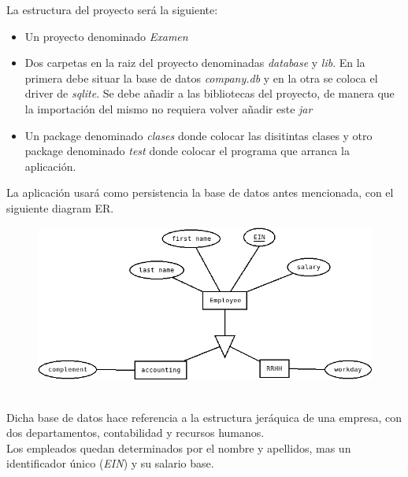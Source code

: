 \documentclass[addpoints,12pt]{exam}
\begin{document}
\begin{center}
\end{center}
\vspace{0.1in}
La estructura del proyecto será la siguiente:
\begin{itemize}
\item Un proyecto denominado \emph{Examen}
\item Dos carpetas en la raiz del proyecto denominadas \emph{database} y \emph{lib}. En la primera debe situar la base de datos \emph{company.db} y en la otra se coloca el driver de \emph{sqlite}. Se debe añadir a las bibliotecas del proyecto, de manera que la importación del mismo no requiera volver añadir este \emph{jar}
\item Un package denominado \emph{clases} donde colocar las disitintas clases y otro package denominado \emph{test} donde colocar el programa que arranca la aplicación.
\end{itemize}
La aplicación usará como persistencia la base de datos antes mencionada, con el siguiente diagram ER.\\
\begin{figure}[h]
\begin{center}
\includegraphics[scale=0.5]{er.png}
%
\end{center}
\end{figure}
\\
Dicha base de datos hace referencia a la estructura jeráquica de una empresa, con dos departamentos, contabilidad y recursos humanos.\\
Los empleados quedan determinados por el nombre y apellidos, mas un identificador único (\emph{EIN})  y su salario base.\\
\end{document}
